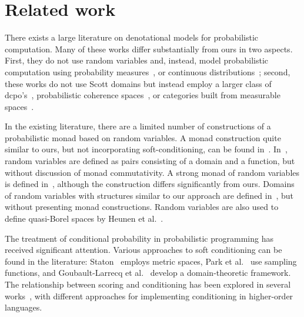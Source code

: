 \section{Related work}
There exists a large literature on denotational models for probabilistic computation. Many of these works differ substantially from ours in two aspects. First, they do not use random variables and, instead, model probabilistic computation using probability measures~\cite{DanosE11,EhrhardPT18,HeunenKSY17,Vakar2019}, or continuous distributions~\cite{GoubaultJT23,JiaLMZ21}; second, these works do not use Scott domains but instead employ a larger class of dcpo's~\cite{JiaLMZ21,GoubaultJT23}, probabilistic coherence spaces~\cite{EhrhardPT18}, or categories built from measurable spaces~\cite{HeunenKSY17,HuotLMS23,Vakar2019}.  

In the existing literature, there are a limited number of constructions of a probabilistic monad based on random variables. A monad construction quite similar to ours, but not incorporating soft-conditioning, can be found in~\cite{DiGianantonio2024}. In~\cite{Barker16}, random variables are defined as pairs consisting of a domain and a function, but without discussion of monad commutativity. A strong monad of random variables is defined in~\cite{GoubaultV11}, although the construction differs significantly from ours. Domains of random variables with structures similar to our approach are defined in~\cite{Mislove16,Scott14}, but without presenting monad constructions. Random variables are also used to define quasi-Borel spaces by Heunen et al.~\cite{HeunenKSY17}.

The treatment of conditional probability in probabilistic programming has received significant attention. Various approaches to soft conditioning can be found in the literature: Staton~\cite{Staton2017} employs metric spaces, Park et al.~\cite{park2008probabilistic} use sampling functions, and Goubault-Larrecq et al.~\cite{GoubaultJT23} develop a domain-theoretic framework. The relationship between scoring and conditioning has been explored in several works~\cite{Staton2017,Vakar2019}, with different approaches for implementing conditioning in higher-order languages.